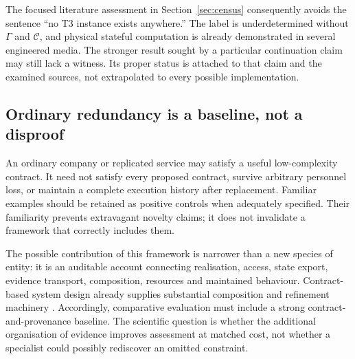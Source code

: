 The focused literature assessment in Section~\ref{sec:census} consequently avoids the sentence ``no T3 instance exists anywhere.'' The label is underdetermined without $\Gamma$ and $\mathcal C$, and physical stateful computation is already demonstrated in several engineered media. The stronger result sought by a particular continuation claim may still lack a witness. Its proper status is attached to that claim and the examined sources, not extrapolated to every possible implementation.

\subsection{Ordinary redundancy is a baseline, not a disproof}
An ordinary company or replicated service may satisfy a useful low-complexity contract. It need not satisfy every proposed contract, survive arbitrary personnel loss, or maintain a complete execution history after replacement. Familiar examples should be retained as positive controls when adequately specified. Their familiarity prevents extravagant novelty claims; it does not invalidate a framework that correctly includes them.

The possible contribution of this framework is narrower than a new species of entity: it is an auditable account connecting realisation, access, state export, evidence transport, composition, resources and maintained behaviour. Contract-based system design already supplies substantial composition and refinement machinery \citep{contracts}. Accordingly, comparative evaluation must include a strong contract-and-provenance baseline. The scientific question is whether the additional organisation of evidence improves assessment at matched cost, not whether a specialist could possibly rediscover an omitted constraint.
